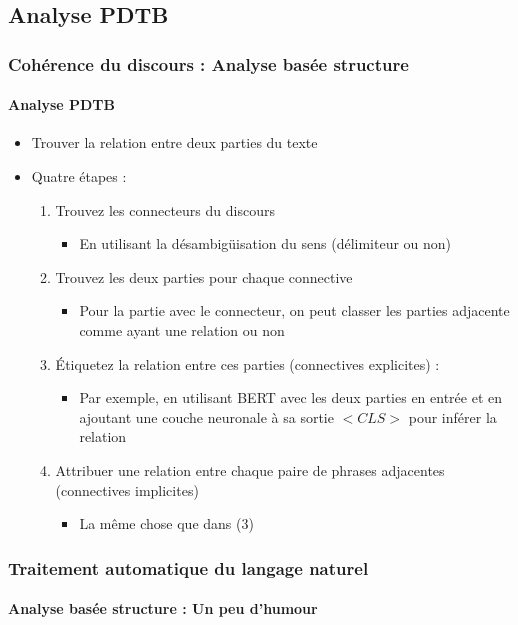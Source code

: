 \documentclass[xcolor=table]{beamer}
\begin{document}
\subsection{Analyse PDTB}

\begin{frame}
	\frametitle{Cohérence du discours : Analyse basée structure}
	\framesubtitle{Analyse PDTB}
	
	\begin{itemize}
		\item Trouver la relation entre deux parties du texte
		\item Quatre étapes : 
		\begin{enumerate}
			\item Trouvez les connecteurs du discours
			\begin{itemize}
				\item En utilisant la désambigüisation du sens (délimiteur ou non)
			\end{itemize}
			\item Trouvez les deux parties pour chaque connective
			\begin{itemize}
				\item Pour la partie avec le connecteur, on peut classer les parties adjacente comme ayant une relation ou non
			\end{itemize}
			\item Étiquetez la relation entre ces parties (connectives explicites) : 
			\begin{itemize}
				\item Par exemple, en utilisant BERT avec les deux parties en entrée et en ajoutant une couche neuronale à sa sortie $ <CLS> $ pour inférer la relation
			\end{itemize}
			\item Attribuer une relation entre chaque paire de phrases adjacentes (connectives implicites)
			\begin{itemize}
				\item La même chose que dans (3)
			\end{itemize}
		\end{enumerate}
	\end{itemize}
	
\end{frame}

\begin{frame}
	\frametitle{Traitement automatique du langage naturel}
	\framesubtitle{Analyse basée structure :  Un peu d'humour}
	
	\begin{center}
	\end{center}
	
\end{frame}
\end{document}
